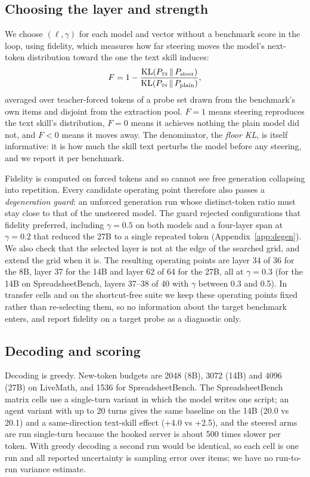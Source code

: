 \documentclass[11pt]{article}
\newcommand{\TS}{\textsc{ts}}
\begin{document}
\subsection{Choosing the layer and strength}
\label{sec:fidelity}

We choose $(\ell,\gamma)$ for each model and vector without a benchmark score in the loop, using
fidelity, which measures how far steering moves the model's next-token distribution toward the one
the text skill induces:
\begin{equation}
  F = 1 - \frac{\mathrm{KL}(P_{\TS}\,\Vert\,P_{\mathrm{steer}})}{\mathrm{KL}(P_{\TS}\,\Vert\,P_{\mathrm{plain}})},
  \label{eq:fidelity}
\end{equation}
averaged over teacher-forced tokens of a probe set drawn from the benchmark's own items and disjoint
from the extraction pool. $F=1$ means steering reproduces the text skill's distribution, $F=0$ means
it achieves nothing the plain model did not, and $F<0$ means it moves away. The denominator, the
\emph{floor KL}, is itself informative: it is how much the skill text perturbs the model before any
steering, and we report it per benchmark.

Fidelity is computed on forced tokens and so cannot see free generation collapsing into repetition.
Every candidate operating point therefore also passes a \emph{degeneration guard}: an unforced
generation run whose distinct-token ratio must stay close to that of the unsteered model. The guard
rejected configurations that fidelity preferred, including $\gamma=0.5$ on both models and a
four-layer span at $\gamma=0.2$ that reduced the 27B to a single repeated token
(Appendix~\ref{app:degen}). We also check that the selected layer is not at the edge of the searched
grid, and extend the grid when it is. The resulting operating points are layer 34 of 36 for the 8B,
layer 37 for the 14B and layer 62 of 64 for the 27B, all at $\gamma=0.3$ (for the 14B on SpreadsheetBench, layers 37--38 of 40 with $\gamma$ between
0.3 and 0.5). In transfer cells and on the
shortcut-free suite we keep these operating points fixed rather than re-selecting them, so no
information about the target benchmark enters, and report fidelity on a target probe as a diagnostic
only.

\subsection{Decoding and scoring}

Decoding is greedy. New-token budgets are 2048 (8B), 3072 (14B) and 4096 (27B) on LiveMath, and 1536
for SpreadsheetBench. The SpreadsheetBench matrix cells use a single-turn variant in which the model
writes one script; an agent variant with up to 20 turns gives the same baseline on the 14B (20.0 vs
20.1) and a same-direction text-skill effect (+4.0 vs +2.5), and the steered arms are run
single-turn because the hooked server is about 500 times slower per token. With greedy decoding a
second run would be identical, so each cell is one run and all reported uncertainty is sampling
error over items; we have no run-to-run variance estimate.
\end{document}
